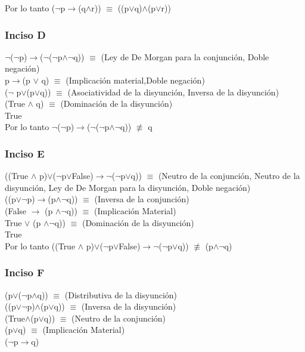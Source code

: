 		Por lo tanto ($\neg$p$\rightarrow$(q$\wedge$r)) $\equiv$ ((p$\vee$q)$\wedge$(p$\vee$r))
		
		\subsubsection{Inciso D}
		$\neg$($\neg$p)$\rightarrow$($\neg$($\neg$p$\wedge$$\neg$q)) $\equiv$ (Ley de De Morgan para la conjunción, Doble negación)\\
		p$\rightarrow$(p $\vee$ q) $\equiv$ (Implicación material,Doble negación)\\
		($\neg$ p$\vee$(p$\vee$q)) $\equiv$ (Asociatividad de la disyunción, Inversa de la disyunción)\\
		(True $\wedge$ q) $\equiv$ (Dominación de la disyunción)\\
		True\\
		
		Por lo tanto $\neg$($\neg$p)$\rightarrow$($\neg$($\neg$p$\wedge$$\neg$q)) $\not\equiv$ q
		
		\subsubsection{Inciso E}
		((True $\wedge$ p)$\vee$($\neg$p$\vee$False)$\rightarrow$$\neg$($\neg$p$\vee$q)) $\equiv$ (Neutro de la conjunción, Neutro de la disyunción, Ley de De Morgan para la disyunción, Doble negación)\\
		((p$\vee$$\neg$p)$\rightarrow$(p$\wedge$$\neg$q)) $\equiv$ (Inversa de la conjunción)\\
		(False $\rightarrow$ (p $\wedge$$\neg$q)) $\equiv$ (Implicación Material)\\
		True $\vee$ (p $\wedge$$\neg$q)) $\equiv$ (Dominación de la disyunción)\\
		True\\
		
		Por lo tanto ((True $\wedge$ p)$\vee$($\neg$p$\vee$False)$\rightarrow$$\neg$($\neg$p$\vee$q)) $\not\equiv$ (p$\wedge$$\neg$q)
		
		\subsubsection{Inciso F}
		(p$\vee$($\neg$p$\wedge$q)) $\equiv$ (Distributiva de la disyunción)\\
		((p$\vee$$\neg$p)$\wedge$(p$\vee$q)) $\equiv$ (Inversa de la disyunción)\\
		(True$\wedge$(p$\vee$q)) $\equiv$ (Neutro de la conjunción)\\
		(p$\vee$q) $\equiv$ (Implicación Material)\\
		($\neg$p$\rightarrow$q)\\
		
